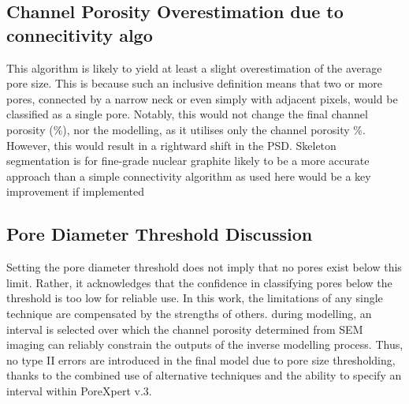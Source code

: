 \documentclass[review]{elsarticle}
\begin{document}
  \subsection{Channel Porosity Overestimation due to connecitivity algo}
  This algorithm is likely to yield at least a slight overestimation of the
average pore size. This is because such an inclusive definition means that two
or more pores, connected by a narrow neck or even simply with adjacent pixels,
would be classified as a single pore. Notably, this would not change the final
channel porosity (\%), nor the modelling, as it utilises only the channel
porosity \%. However, this would result in a rightward shift in the PSD.
Skeleton segmentation is for fine-grade nuclear graphite likely to be a more
accurate approach than a simple connectivity algorithm as used here would be a
key improvement if implemented
\cite{ARREGUIMENA2022112047}

\subsection{Pore Diameter Threshold Discussion}
   Setting the pore diameter  threshold does not imply that no pores exist below
   this limit. Rather, it acknowledges that the confidence in classifying pores
   below the threshold is too low for reliable use. In this work, the
   limitations of any single technique are compensated by the strengths of
   others. during modelling, an interval is selected over which the channel
   porosity determined from SEM imaging can reliably constrain the outputs of
   the inverse modelling process. Thus, no type II errors are introduced in the
   final model due to pore size thresholding, thanks to the combined use of
   alternative techniques and the ability to specify an interval within
   PoreXpert v.3.

\end{document}
